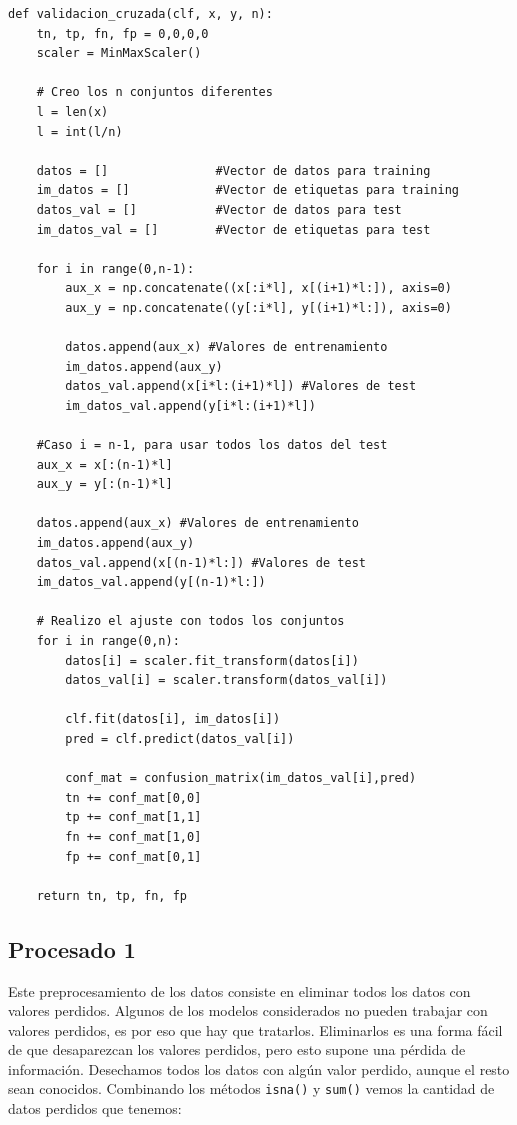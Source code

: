 \documentclass[a4]{article}
\begin{document}
\begin{lstlisting}
def validacion_cruzada(clf, x, y, n):
    tn, tp, fn, fp = 0,0,0,0
    scaler = MinMaxScaler()

    # Creo los n conjuntos diferentes
    l = len(x)
    l = int(l/n)

    datos = []               #Vector de datos para training
    im_datos = []            #Vector de etiquetas para training
    datos_val = []           #Vector de datos para test
    im_datos_val = []        #Vector de etiquetas para test

    for i in range(0,n-1):
        aux_x = np.concatenate((x[:i*l], x[(i+1)*l:]), axis=0)
        aux_y = np.concatenate((y[:i*l], y[(i+1)*l:]), axis=0)
        
        datos.append(aux_x) #Valores de entrenamiento
        im_datos.append(aux_y)
        datos_val.append(x[i*l:(i+1)*l]) #Valores de test
        im_datos_val.append(y[i*l:(i+1)*l])  
        
    #Caso i = n-1, para usar todos los datos del test
    aux_x = x[:(n-1)*l]
    aux_y = y[:(n-1)*l]
        
    datos.append(aux_x) #Valores de entrenamiento
    im_datos.append(aux_y)
    datos_val.append(x[(n-1)*l:]) #Valores de test
    im_datos_val.append(y[(n-1)*l:])
        
    # Realizo el ajuste con todos los conjuntos
    for i in range(0,n):
        datos[i] = scaler.fit_transform(datos[i])
        datos_val[i] = scaler.transform(datos_val[i])
        
        clf.fit(datos[i], im_datos[i])
        pred = clf.predict(datos_val[i])
        
        conf_mat = confusion_matrix(im_datos_val[i],pred)
        tn += conf_mat[0,0]
        tp += conf_mat[1,1]
        fn += conf_mat[1,0]
        fp += conf_mat[0,1]

    return tn, tp, fn, fp
  \end{lstlisting}

\newpage
\subsection{Procesado 1}

Este preprocesamiento de los datos consiste en eliminar todos los datos con valores perdidos. Algunos de los modelos considerados no pueden trabajar con valores perdidos, es por eso que hay que tratarlos. Eliminarlos es una forma fácil de que desaparezcan los valores perdidos, pero esto supone una pérdida de información. Desechamos todos los datos con algún valor perdido, aunque el resto sean conocidos. Combinando los métodos \texttt{isna()} y \texttt{sum()} vemos la cantidad de datos perdidos que tenemos:
\end{document}
